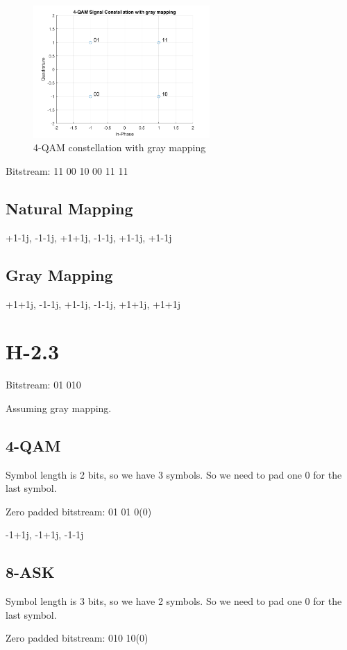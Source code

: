 \documentclass{article}
\begin{document}
\begin{figure}[h]
\centering
\includegraphics[width=0.6\textwidth]{4_QAM_gray.png}
\caption{4-QAM constellation with gray mapping}
\label{fig:4qamgray}
\end{figure}

Bitstream: 11 00 10 00 11 11

\subsection{Natural Mapping}
+1-1j, -1-1j, +1+1j, -1-1j, +1-1j, +1-1j

\subsection{Gray Mapping}
+1+1j, -1-1j, +1-1j, -1-1j, +1+1j, +1+1j

\section{H-2.3}

Bitstream: 01 010

Assuming gray mapping.

\subsection{4-QAM}
Symbol length is 2 bits, so we have 3 symbols. So we need to pad one 0 for the last symbol.

Zero padded bitstream: 01 01 0(0)

-1+1j, -1+1j, -1-1j

\subsection{8-ASK}
Symbol length is 3 bits, so we have 2 symbols. So we need to pad one 0 for the last symbol.

Zero padded bitstream: 010 10(0)
\end{document}

